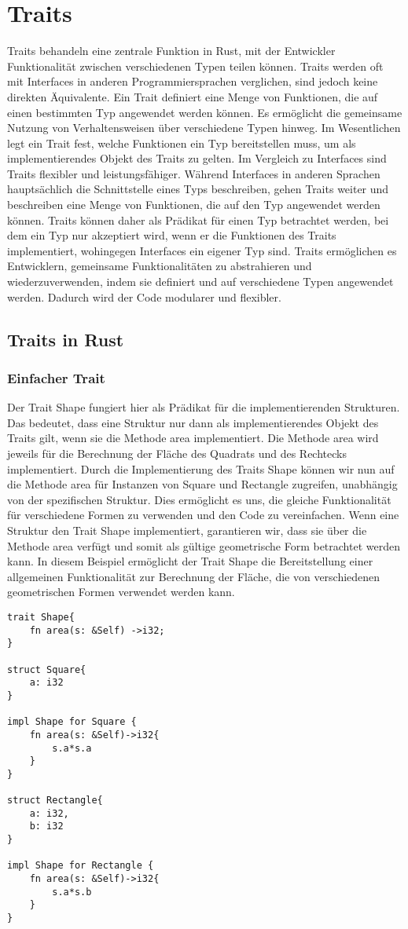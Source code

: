 \documentclass[a4paper, 1ppt]{article}
\begin{document}
\section{Traits}
Traits behandeln eine zentrale Funktion in Rust, mit der Entwickler Funktionalität zwischen verschiedenen Typen teilen können. Traits werden oft mit Interfaces in anderen Programmiersprachen verglichen, sind jedoch keine direkten Äquivalente.
Ein Trait definiert eine Menge von Funktionen, die auf einen bestimmten Typ angewendet werden können. Es ermöglicht die gemeinsame Nutzung von Verhaltensweisen über verschiedene Typen hinweg. Im Wesentlichen legt ein Trait fest, welche Funktionen ein Typ bereitstellen muss, um als implementierendes Objekt des Traits zu gelten.
Im Vergleich zu Interfaces sind Traits flexibler und leistungsfähiger. Während Interfaces in anderen Sprachen hauptsächlich die Schnittstelle eines Typs beschreiben, gehen Traits weiter und beschreiben eine Menge von Funktionen, die auf den Typ angewendet werden können. Traits können daher als Prädikat für einen Typ betrachtet werden, bei dem ein Typ nur akzeptiert wird, wenn er die Funktionen des Traits implementiert, wohingegen Interfaces ein eigener Typ sind.
Traits ermöglichen es Entwicklern, gemeinsame Funktionalitäten zu abstrahieren und wiederzuverwenden, indem sie definiert und auf verschiedene Typen angewendet werden. Dadurch wird der Code modularer und flexibler.
\subsection{Traits in Rust}
\subsubsection{Einfacher Trait}
Der Trait Shape fungiert hier als Prädikat für die implementierenden Strukturen. Das bedeutet, dass eine Struktur nur dann als implementierendes Objekt des Traits gilt, wenn sie die Methode area implementiert.
Die Methode area wird jeweils für die Berechnung der Fläche des Quadrats und des Rechtecks implementiert.
Durch die Implementierung des Traits Shape können wir nun auf die Methode area für Instanzen von Square und Rectangle zugreifen, unabhängig von der spezifischen Struktur. Dies ermöglicht es uns, die gleiche Funktionalität für verschiedene Formen zu verwenden und den Code zu vereinfachen.
 Wenn eine Struktur den Trait Shape implementiert, garantieren wir, dass sie über die Methode area verfügt und somit als gültige geometrische Form betrachtet werden kann.
 In diesem Beispiel ermöglicht der Trait Shape die Bereitstellung einer allgemeinen Funktionalität zur Berechnung der Fläche, die von verschiedenen geometrischen Formen verwendet werden kann.
\begin{verbatim}
trait Shape{
    fn area(s: &Self) ->i32;
}

struct Square{
    a: i32
}

impl Shape for Square {
    fn area(s: &Self)->i32{
        s.a*s.a
    }
}

struct Rectangle{
    a: i32,
    b: i32
}

impl Shape for Rectangle {
    fn area(s: &Self)->i32{
        s.a*s.b
    }
}

\end{verbatim}
\end{document}
